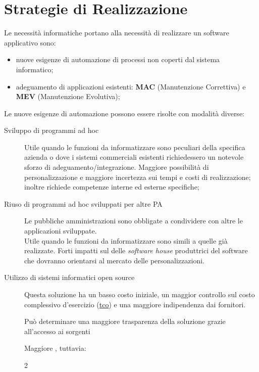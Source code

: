 \section{Strategie di Realizzazione}\label{sec:cv_strategie_di_realizzazione} %
Le necessità informatiche portano alla necessità di realizzare un software applicativo sono:
\begin{itemize}
    \item nuove esigenze di automazione di processi non coperti dal sistema informatico;
    \item adeguamento di applicazioni esistenti: \textbf{MAC} (Manutenzione Correttiva) e \textbf{MEV} (Manutenzione Evolutiva);
\end{itemize}
Le nuove esigenze di automazione possono essere risolte con modalità diverse:
\begin{description}
    \item[Sviluppo di programmi ad hoc] Utile quando le funzioni da informatizzare sono peculiari della specifica azienda o dove i sistemi commerciali esistenti richiedessero un notevole sforzo di adeguamento/integrazione.
        Maggiore possibilità di personalizzazione e maggiore incertezza sui tempi e costi di realizzazione; inoltre richiede competenze interne ed esterne specifiche;
    \item[Riuso di programmi ad hoc sviluppati per altre PA] Le pubbliche amministrazioni sono obbligate a condividere con altre le applicazioni sviluppate.
        \\
        Utile quando le funzioni da informatizzare sono simili a quelle già realizzate.
        Forti impatti sul  delle \textit{software house} produttrici del software che dovranno orientarsi al mercato delle personalizzazioni.
    \item[Utilizzo di sistemi informatici open source] Questa soluzione ha un basso costo iniziale, un maggior controllo sul costo complessivo d'esercizio (\hyperref[sub:ftt_total_cost_ownership]{\ac{tco}}) e una maggiore indipendenza dai fornitori.
        \begin{note}
            Può determinare una maggiore trasparenza della soluzione grazie all'accesso ai sorgenti
        \end{note}
        \begin{warning}
            Maggiore , tuttavia:
            \begin{multicols}{2}
                \begin{itemize}

\end{itemize}
\end{multicols}
\end{warning}
\end{description}
